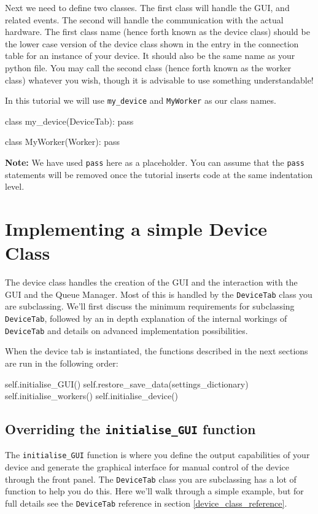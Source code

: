 \documentclass[12pt]{article}
\begin{document}
Next we need to define two classes. 
The first class will handle the GUI, and related events. 
The second will handle the communication with the actual hardware. 
The first class name (hence forth known as the device class) should be the lower case version of the device class shown in the entry in the connection table for an instance of your device. 
It should also be the same name as your python file. 
You may call the second class (hence forth known as the worker class) whatever you wish, though it is advisable to use something understandable!

In this tutorial we will use \texttt{my\_device} and \texttt{MyWorker} as our class names. 

\begin{python}
class my_device(DeviceTab):
    pass
	
class MyWorker(Worker):
    pass
\end{python}

\textbf{Note:} We have used \texttt{pass} here as a placeholder. 
You can assume that the \texttt{pass} statements will be removed once the tutorial inserts code at the same indentation level.


\section{Implementing a simple Device Class}\label{device_class}
The device class handles the creation of the GUI and the interaction with the GUI and the Queue Manager. 
Most of this is handled by the \texttt{DeviceTab} class you are subclassing.
We'll first discuss the minimum requirements for subclassing \texttt{DeviceTab}, followed by an in depth explanation of the internal workings of \texttt{DeviceTab} and details on advanced implementation possibilities.

When the device tab is instantiated, the functions described in the next sections are run in the following order:
\begin{python}
    self.initialise_GUI() 
    self.restore_save_data(settings_dictionary)
    self.initialise_workers()
    self.initialise_device()
\end{python}

\subsection{Overriding the \texttt{initialise\_GUI} function}\label{tutorial:overriding_initialise_GUI}
The \texttt{initialise\_GUI} function is where you define the output capabilities of your device and generate the graphical interface for manual control of the device through the front panel.
The \texttt{DeviceTab} class you are subclassing has a lot of function to help you do this.
Here we'll walk through a simple example, but for full details see the \texttt{DeviceTab} reference in section \ref{device_class_reference}.
\end{document}
